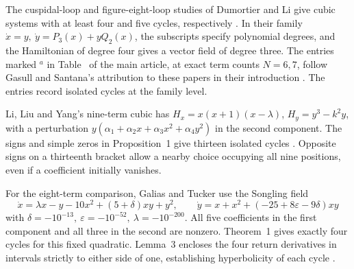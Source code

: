The cuspidal-loop and figure-eight-loop studies of Dumortier and Li give cubic systems with at least four and five cycles, respectively \cite{DumortierLi2,DumortierLi4}. In their family \(\dot x=y,\ \dot y=P_3(x)+yQ_2(x)\), the subscripts specify polynomial degrees, and the Hamiltonian of degree four gives a vector field of degree three. The entries marked \(^{a}\) in Table~ of the main article, at exact term counts \(N=6,7\), follow Gasull and Santana's attribution to these papers in their introduction \cite{GasullSantana2024}. The entries record isolated cycles at the family level.

Li, Liu and Yang's nine-term cubic has \(H_x=x(x+1)(x-\lambda)\), \(H_y=y^3-k^2y\), with a perturbation \(y(\alpha_1+\alpha_2 x+\alpha_3 x^2+\alpha_4 y^2)\) in the second component. The signs and simple zeros in Proposition~1 give thirteen isolated cycles \cite[pp.~3610--3613, Eqs.~(3)--(4)]{LiLiuYang}. Opposite signs on a thirteenth bracket allow a nearby choice occupying all nine positions, even if a coefficient initially vanishes.

For the eight-term comparison, Galias and Tucker use the Songling field
\[
 \dot x=\lambda x-y-10x^2+(5+\delta)xy+y^2,\qquad
 \dot y=x+x^2+(-25+8\varepsilon-9\delta)xy
\]
with \(\delta=-10^{-13},\ \varepsilon=-10^{-52},\ \lambda=-10^{-200}\). All five coefficients in the first component and all three in the second are nonzero. Theorem~1 gives exactly four cycles for this fixed quadratic. Lemma~3 encloses the four return derivatives in intervals strictly to either side of one, establishing hyperbolicity of each cycle \cite[Eq.~(1) and Lemma~3, pp.~2, 4]{GaliasTucker2022}.


